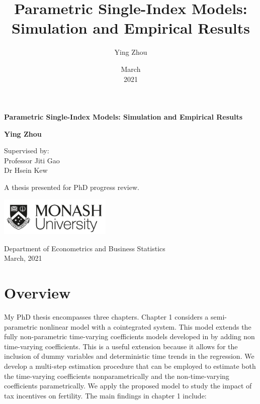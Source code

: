 \documentclass[a4paper,12pt,times,numbered,print,index]{report}
\title{{Parametric Single-Index Models: Simulation and Empirical Results} \vspace{2cm}}
\author{Ying Zhou}
\date{March \\ 2021}
\numberwithin{equation}{section}
\begin{document}
	
	\begin{titlepage}
		\begin{center}
			\vspace*{1cm}
			
			\Huge
			\textbf{Parametric Single-Index Models: Simulation and Empirical Results}
			
			\vspace{2.5cm}
			
			\large
			\textbf{Ying Zhou} \\
			
			\vspace{0.5cm}
			
			Supervised by: \\
			Professor Jiti Gao \\
			Dr Hsein Kew
			
			\vfill
			
			A thesis presented for PhD progress review.
			
			\vspace{0.8cm}
			
			\includegraphics[width=0.4\textwidth]{plots/monash-university-logo.png}
			
			Department of Econometrics and Business Statistics \\
			
			March,  2021
			
		\end{center}
	\end{titlepage}
	
	
	\section{Overview}
	
	
	My PhD thesis encompasses three chapters. Chapter 1 considers a
	semi-parametric nonlinear model with a cointegrated system. This model
	extends the fully non-parametric time-varying coefficients models developed
	in \cite{li2016estimation}  by adding non time-varying
	coefficients. This is a useful extension because it allows for the inclusion
	of dummy variables and deterministic time trends in the regression. We
	develop a multi-step estimation procedure that can be employed to estimate
	both the time-varying coefficients nonparametrically and the
	non-time-varying coefficients parametrically. We apply the proposed model to
	study the impact of tax incentives on fertility. The main findings in chapter 1 include:
	
\end{document}
